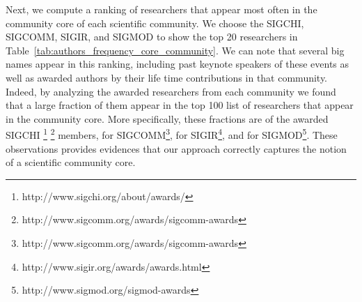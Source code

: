 Next, we compute a ranking of researchers that appear most often in the community core of each scientific community.  We choose the SIGCHI, SIGCOMM, SIGIR, and SIGMOD to show the
top 20 researchers in Table~\ref{tab:authors_frequency_core_community}.  We can note that several big names appear in this ranking, including past keynote speakers of these events
as well as awarded authors by their life time contributions in that community. Indeed, by analyzing the awarded researchers from each community we found that a large fraction of
them appear in the top 100 list of researchers that appear in the community core. More specifically, these fractions are  of the awarded SIGCHI
\footnote{http://www.sigchi.org/about/awards/} \footnote{http://www.sigcomm.org/awards/sigcomm-awards} members,  for
SIGCOMM\footnote{http://www.sigcomm.org/awards/sigcomm-awards},  for SIGIR\footnote{http://www.sigir.org/awards/awards.html}, and  for
SIGMOD\footnote{http://www.sigmod.org/sigmod-awards}.  These observations provides evidences that our approach correctly captures the notion of a scientific community core. 

